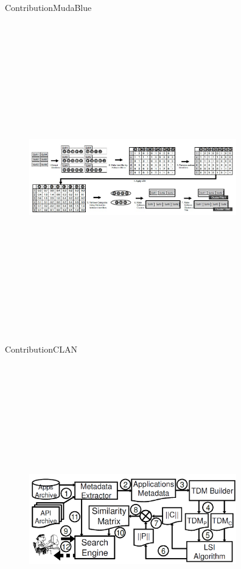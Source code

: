 \documentclass{beamer}
\begin{document}
\begin{frame}{Contribution}{MudaBlue}
	\begin{figure}[!h]
	\includegraphics[width=9cm,height=13.5cm,keepaspectratio]{images/Mudablue1.png}
	\centering
	\label{fig:MudaBlue}
	\end{figure}
\end{frame}

\begin{frame}{Contribution}{CLAN}
	\begin{figure}[!h]
	\includegraphics[width=9cm,height=13.5cm,keepaspectratio]{images/Clan.png}
	\centering
	\label{fig:Clan}
	\end{figure}
\end{frame}
\end{document}

